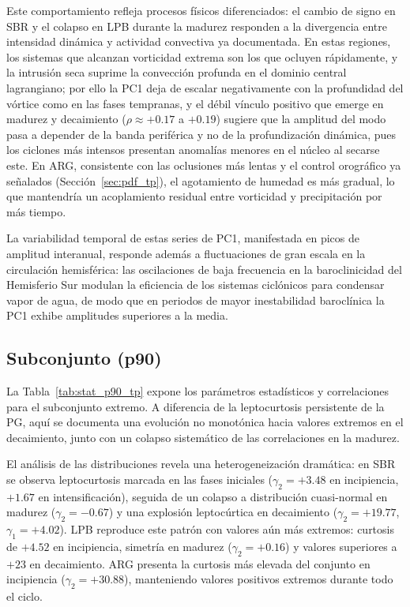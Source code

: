 Este comportamiento refleja procesos físicos diferenciados: el cambio de signo en SBR y el colapso en LPB durante la madurez responden a la divergencia entre intensidad dinámica y actividad convectiva ya documentada. 
En estas regiones, los sistemas que alcanzan vorticidad extrema son los que ocluyen rápidamente, y la intrusión seca suprime la convección profunda en el dominio central lagrangiano; por ello la PC1 deja de escalar negativamente con la profundidad del vórtice como en las fases tempranas, y el débil vínculo positivo que emerge en madurez y decaimiento ($\rho \approx +0.17$ a $+0.19$) sugiere que la amplitud del modo pasa a depender de la banda periférica y no de la profundización dinámica, pues los ciclones más intensos presentan anomalías menores en el núcleo al secarse este.
En ARG, consistente con las oclusiones más lentas y el control orográfico ya señalados (Sección~\ref{sec:pdf_tp}), el agotamiento de humedad es más gradual, lo que mantendría un acoplamiento residual entre vorticidad y precipitación por más tiempo.

La variabilidad temporal de estas series de PC1, manifestada en picos de amplitud interanual, responde además a fluctuaciones de gran escala en la circulación hemisférica: las oscilaciones de baja frecuencia en la baroclinicidad del Hemisferio Sur \citep{machado2020influence} modulan la eficiencia de los sistemas ciclónicos para condensar vapor de agua, de modo que en periodos de mayor inestabilidad baroclínica la PC1 exhibe amplitudes superiores a la media.



\subsection{Subconjunto (p90)}\label{subsec:pc1_p90_tp}

La Tabla~\ref{tab:stat_p90_tp} expone los parámetros estadísticos y correlaciones para el subconjunto extremo. A diferencia de la leptocurtosis persistente de la PG, aquí se documenta una evolución no monotónica hacia valores extremos en el decaimiento, junto con un colapso sistemático de las correlaciones en la madurez.

El análisis de las distribuciones revela una heterogeneización dramática: en SBR se observa leptocurtosis marcada en las fases iniciales ($\gamma_2 = +3.48$ en incipiencia, $+1.67$ en intensificación), seguida de un colapso a distribución cuasi-normal en madurez ($\gamma_2 = -0.67$) y una explosión leptocúrtica en decaimiento ($\gamma_2 = +19.77$, $\gamma_1 = +4.02$). LPB reproduce este patrón con valores aún más extremos: curtosis de $+4.52$ en incipiencia, simetría en madurez ($\gamma_2 = +0.16$) y valores superiores a $+23$ en decaimiento. ARG presenta la curtosis más elevada del conjunto en incipiencia ($\gamma_2 = +30.88$), manteniendo valores positivos extremos durante todo el ciclo.

